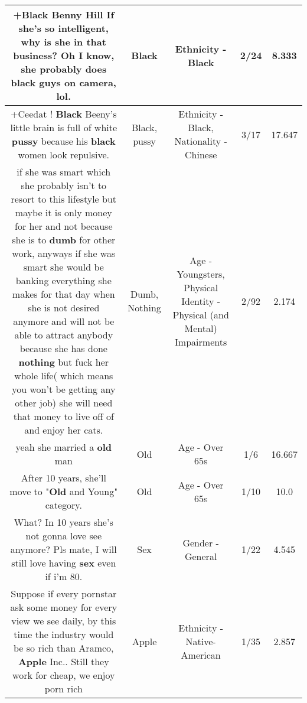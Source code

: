 \documentclass[11pt]{article}
\newlength\mylength
\begin{document}
\begin{center}
\begin{longtable}{|C{.65\mylength}|C{.30\mylength}|C{.12\mylength}|C{.12\mylength}|C{.12\mylength}|}
  \small +\textbf{Black} Benny Hill If she's so intelligent, why is she in that business? Oh I know, she probably does \textbf{black} guys on camera, lol.\normalsize   & Black & Ethnicity - Black & 2/24 & 8.333 \\  \hline
  \small +Ceedat ! \textbf{Black} Beeny's little brain is full of white \textbf{pussy} because his \textbf{black} women look repulsive.\normalsize   & Black, pussy & Ethnicity - Black, Nationality - Chinese & 3/17 & 17.647 \\  \hline
  \small if she was smart which she probably isn't to resort to this lifestyle but maybe it is only money for her and not because she is to \textbf{dumb} for other work, anyways if she was smart she would be banking everything she makes for that day when she is not desired anymore and will not be able to attract anybody because she has done \textbf{nothing} but fuck her whole life( which means you won't be getting any other job) she will need that money to live off of and enjoy her cats.\normalsize   & Dumb, Nothing & Age - Youngsters, Physical Identity - Physical (and Mental) Impairments & 2/92 & 2.174 \\  \hline
  \small yeah she married a \textbf{old} man\normalsize   & Old & Age - Over 65s & 1/6 & 16.667 \\  \hline
  \small After 10 years, she'll move to "\textbf{Old} and Young" category.\normalsize   & Old & Age - Over 65s & 1/10 & 10.0 \\  \hline
  \small What? In 10 years she's not gonna love see anymore? Pls mate, I will still love having \textbf{sex} even if i'm 80.\normalsize   & Sex & Gender - General & 1/22 & 4.545 \\  \hline
  \small Suppose if every pornstar ask some money for every view we see daily, by this time the industry would be so rich than Aramco, \textbf{Apple} Inc.. Still they work for cheap, we enjoy porn rich\normalsize   & Apple & Ethnicity - Native-American & 1/35 & 2.857 \\  \hline

\end{longtable}
\end{center}
\end{document}
